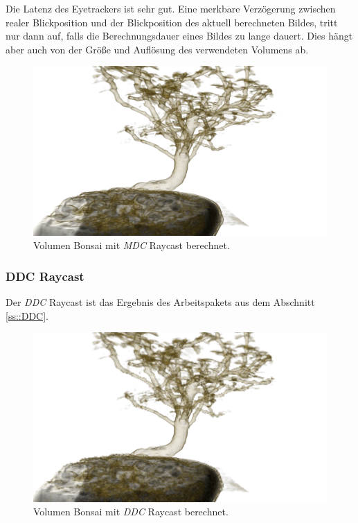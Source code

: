 Die Latenz des Eyetrackers ist sehr gut.
Eine merkbare Verzögerung zwischen realer Blickposition und der Blickposition des aktuell berechneten Bildes, tritt nur dann auf, falls die Berechnungsdauer eines Bildes zu lange dauert.
Dies hängt aber auch von der Größe und Auflösung des verwendeten Volumens ab.
\begin{landscape}
	\begin{figure}
		\centering
		\includegraphics[width=1\textheight]{../../Grafiken/results/picture_quality/bonsai/MDC_img-0-96_ray-1-5.png}
		\caption{Volumen Bonsai mit \emph{MDC} Raycast berechnet.}
		\label{fig::res::bon_mdc}
	\end{figure}
\end{landscape}

\subsubsection{DDC Raycast}\label{ss::res::ddc}
Der \emph{DDC} Raycast ist das Ergebnis des Arbeitspakets aus dem Abschnitt \ref{ss::DDC}.

\begin{landscape}
	\begin{figure}
		\centering
		\includegraphics[width=1\textheight]{../../Grafiken/results/picture_quality/bonsai/DDC_img-1_ray-1-5.png}
		\caption{Volumen Bonsai mit \emph{DDC} Raycast berechnet.}
		\label{fig::res::bon_ddc}
	\end{figure}
\end{landscape}


